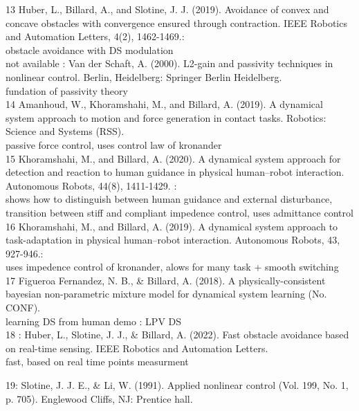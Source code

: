 13 Huber, L., Billard, A., and Slotine, J. J. (2019). Avoidance of convex and concave obstacles with convergence ensured through contraction. IEEE Robotics and Automation Letters, 4(2), 1462-1469.: \\
obstacle avoidance with DS modulation\\

not available : Van der Schaft, A. (2000). L2-gain and passivity techniques in nonlinear control. Berlin, Heidelberg: Springer Berlin Heidelberg.\\
fundation of passivity theory\\

14 Amanhoud, W., Khoramshahi, M., and Billard, A. (2019). A dynamical system approach to motion and force generation in contact tasks. Robotics: Science and Systems (RSS).\\
passive force control, uses control law of kronander\\

15 Khoramshahi, M., and Billard, A. (2020). A dynamical system approach for detection and reaction to human guidance in physical human–robot interaction. Autonomous Robots, 44(8), 1411-1429. :\\
shows how to distinguish between human guidance and external disturbance, transition between stiff and compliant impedence control, uses admittance control\\

16 Khoramshahi, M., and Billard, A. (2019). A dynamical system approach to task-adaptation in physical human–robot interaction. Autonomous Robots, 43, 927-946.:\\
uses impedence control of kronander, alows for many task + smooth switching\\

17 Figueroa Fernandez, N. B., & Billard, A. (2018). A physically-consistent bayesian non-parametric mixture model for dynamical system learning (No. CONF).\\
learning DS from human demo : LPV DS\\

18 : Huber, L., Slotine, J. J., & Billard, A. (2022). Fast obstacle avoidance based on real-time sensing. IEEE Robotics and Automation Letters.\\
fast, based on real time points measurment

19: Slotine, J. J. E., & Li, W. (1991). Applied nonlinear control (Vol. 199, No. 1, p. 705). Englewood Cliffs, NJ: Prentice hall.

